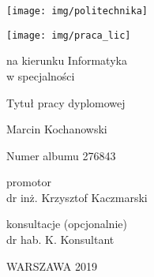 \documentclass[12pt,twoside,a4paper]{article}
\newcommand{\discipline}{Informatyka}
\renewcommand{\title}{Tytuł pracy dyplomowej}
\renewcommand{\author}{Mateusz Chiliński}
\newcommand{\album}{276843}
\renewcommand{\author}{Marcin Kochanowski}
\newcommand{\album}{000000}
\newcommand{\supervisor}{dr inż. Krzysztof Kaczmarski}
\renewcommand{\year}{2019}
\begin{document}
\pagestyle{empty}

\begin{center}
\texttt{[image: img/politechnika]} 
\vspace{70pt}


\texttt{[image: img/praca\_lic]} %

{ \arial na kierunku \discipline
\\ w specjalności \spec %

\vspace{40pt}
{\arial \large \title}

\vspace{50pt}

{\arial \huge \author}

\vspace{5pt}

Numer albumu \album

\vspace{40pt}

promotor \\
{\arial \supervisor}

\vspace{15pt}
 
konsultacje (opcjonalnie)\\
{\arial
dr hab. K. Konsultant
}

 \vfill
WARSZAWA \year \\
}
\end{center}
\end{document}
